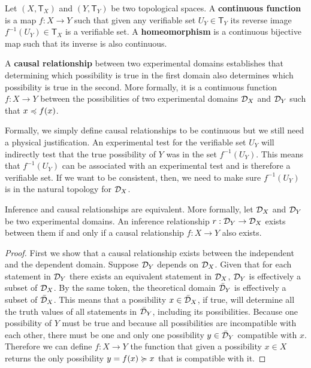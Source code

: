 \documentclass[11pt,letterpaper,fleqn]{memoir} %
\begin{document}
\begin{mathSection}
	\begin{defn}
		Let $(X, \mathsf{T}_X)$ and $(Y, \mathsf{T}_Y)$ be two topological spaces. A \textbf{continuous function} is a map $f: X \to Y$ such that given any verifiable set $U_Y \in \mathsf{T}_Y$ its reverse image $f^{-1}(U_Y) \in \mathsf{T}_X$ is a verifiable set. A \textbf{homeomorphism} is a continuous bijective map such that its inverse is also continuous.
	\end{defn}
	\begin{defn}
		A \textbf{causal relationship} between two experimental domains establishes that determining which possibility is true in the first domain also determines which possibility is true in the second. More formally, it is a continuous function $f : X \to Y$ between the possibilities of two experimental domains $\mathcal{D}_X$ and $\mathcal{D}_Y$ such that $x \preccurlyeq f(x)$.
	\end{defn}
	\begin{justification}
		Formally, we simply define causal relationships to be continuous but we still need a physical justification. An experimental test for the verifiable set $U_Y$ will indirectly test that the true possibility of $Y$ was in the set $f^{-1}(U_Y)$. This means that $f^{-1}(U_Y)$ can be associated with an experimental test and is therefore a verifiable set. If we want to be consistent, then, we need to make sure $f^{-1}(U_Y)$ is in the natural topology for $\mathcal{D}_X$.
	\end{justification}
	\begin{thrm}
		Inference and causal relationships are equivalent. More formally, let $\mathcal{D}_X$ and $\mathcal{D}_Y$ be two experimental domains. An inference relationship $r: \mathcal{D}_Y \to \mathcal{D}_X$ exists between them if and only if a causal relationship $f: X \to Y$ also exists.
	\end{thrm}
	\begin{proof}
		First we show that a causal relationship exists between the independent and the dependent domain. Suppose $\mathcal{D}_Y$ depends on $\mathcal{D}_X$. Given that for each statement in $\mathcal{D}_Y$ there exists an equivalent statement in $\mathcal{D}_X$, $\mathcal{D}_Y$ is effectively a subset of $\mathcal{D}_X$. By the same token, the theoretical domain $\bar{\mathcal{D}}_Y$ is effectively a subset of $\bar{\mathcal{D}}_X$. This means that a possibility $x \in \bar{\mathcal{D}}_X$, if true, will determine all the truth values of  all statements in $\bar{\mathcal{D}}_Y$, including its possibilities. Because one possibility of $Y$ must be true and because all possibilities are incompatible with each other, there must be one and only one possibility $y \in \bar{\mathcal{D}}_Y$ compatible with $x$. Therefore we can define $f : X \to Y$ the function that given a possibility $x \in X$ returns the only possibility $y=f(x) \succcurlyeq x$ that is compatible with it.
		

\end{proof}
\end{mathSection}
\end{document}
